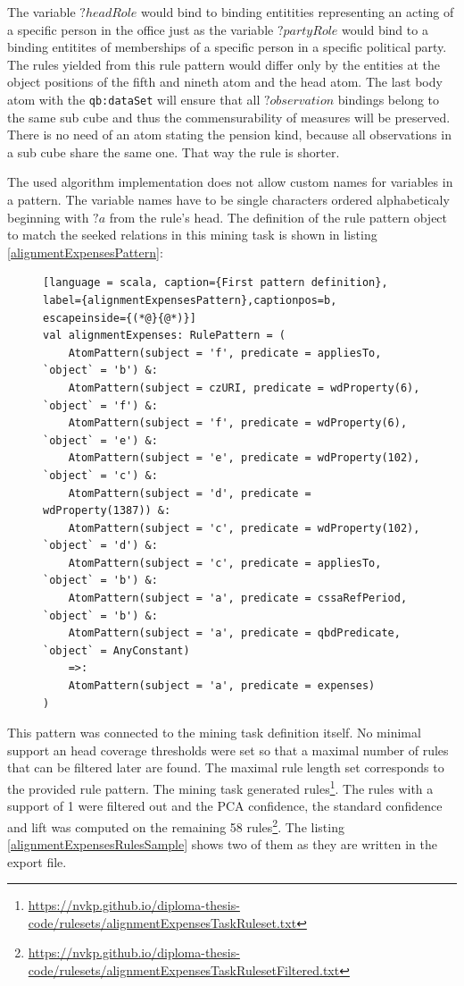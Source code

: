 The variable $?headRole$ would bind to binding entitities representing an acting of a specific person in the office just as the variable $?partyRole$ would bind to a binding entitites of memberships of a specific person in a specific political party. The rules yielded from this rule pattern would differ only by the entities at the object positions of the fifth and nineth atom and the head atom. The last body atom with the \verb|qb:dataSet| will ensure that all $?observation$ bindings belong to the same sub cube and thus the commensurability of measures will be preserved. There is no need of an atom stating the pension kind, because all observations in a sub cube share the same one. That way the rule is shorter.

The used algorithm implementation does not allow custom names for variables in a pattern. The variable names have to be single characters ordered alphabeticaly beginning with $?a$ from the rule's head. The definition of the rule pattern object to match the seeked relations in this mining task is shown in listing \ref{alignmentExpensesPattern}:

\begin{figure}[h]
\begin{lstlisting}[language = scala, caption={First pattern definition}, label={alignmentExpensesPattern},captionpos=b, escapeinside={(*@}{@*)}]
val alignmentExpenses: RulePattern = (
    AtomPattern(subject = 'f', predicate = appliesTo, `object` = 'b') &:
    AtomPattern(subject = czURI, predicate = wdProperty(6), `object` = 'f') &:
    AtomPattern(subject = 'f', predicate = wdProperty(6), `object` = 'e') &:
    AtomPattern(subject = 'e', predicate = wdProperty(102), `object` = 'c') &:  
    AtomPattern(subject = 'd', predicate = wdProperty(1387)) &:
    AtomPattern(subject = 'c', predicate = wdProperty(102), `object` = 'd') &:
    AtomPattern(subject = 'c', predicate = appliesTo, `object` = 'b') &:
    AtomPattern(subject = 'a', predicate = cssaRefPeriod, `object` = 'b') &:
    AtomPattern(subject = 'a', predicate = qbdPredicate, `object` = AnyConstant)
    =>:
    AtomPattern(subject = 'a', predicate = expenses)
)
\end{lstlisting}
\end{figure}

This pattern was connected to the mining task definition itself. No minimal support an head coverage thresholds were set so that a maximal number of rules that can be filtered later are found. The maximal rule length set corresponds to the provided rule pattern. The mining task generated  rules\footnote{\href{https://nvkp.github.io/diploma-thesis-code/rulesets/alignmentExpensesTaskRuleset.txt}{https://nvkp.github.io/diploma-thesis-code/rulesets/alignmentExpensesTaskRuleset.txt}}. The rules with a support of 1 were filtered out and the PCA confidence, the standard confidence and lift was computed on the remaining 58 rules\footnote{\href{https://nvkp.github.io/diploma-thesis-code/rulesets/alignmentExpensesTaskRulesetFiltered.txt}{https://nvkp.github.io/diploma-thesis-code/rulesets/alignmentExpensesTaskRulesetFiltered.txt}}. The listing \ref{alignmentExpensesRulesSample} shows two of them as they are written in the export file.

